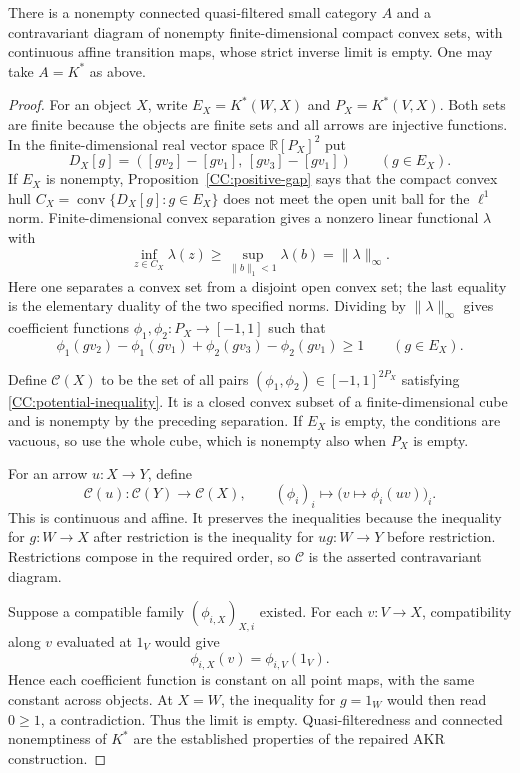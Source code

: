 \begin{theorem}
\label{CC:convex-counterexample}
There is a nonempty connected quasi-filtered small category $A$ and
a contravariant diagram of nonempty finite-dimensional compact convex
sets, with continuous affine transition maps, whose strict inverse
limit is empty. One may take $A=K^*$ as above.
\end{theorem}
\begin{proof}
For an object $X$, write $E_X=K^*(W,X)$ and $P_X=K^*(V,X)$.
Both sets are finite because the objects are finite sets and all
arrows are injective functions. In the finite-dimensional real vector
space $\mathbb R[P_X]^2$ put
\[
 D_X[g]=([gv_2]-[gv_1],\,[gv_3]-[gv_1])
 \qquad(g\in E_X).
\]
If $E_X$ is nonempty, Proposition~\ref{CC:positive-gap} says that the
compact convex hull $C_X=\operatorname{conv}\{D_X[g]:g\in E_X\}$
does not meet the open unit ball for the $\ell^1$ norm.
Finite-dimensional convex separation gives a nonzero linear functional
$\lambda$ with
\[
 \inf_{z\in C_X}\lambda(z)
 \geq\sup_{\|b\|_1<1}\lambda(b)=\|\lambda\|_\infty.
\]
Here one separates a convex set from a disjoint open convex set; the
last equality is the elementary duality of the two specified norms.
Dividing by $\|\lambda\|_\infty$ gives coefficient functions
$\phi_1,\phi_2:P_X\to[-1,1]$ such that
\begin{equation}\label{CC:potential-inequality}
 \phi_1(gv_2)-\phi_1(gv_1)
 +\phi_2(gv_3)-\phi_2(gv_1)\geq1
 \qquad(g\in E_X).
\end{equation}

Define $\mathcal C(X)$ to be the set of all pairs
$(\phi_1,\phi_2)\in[-1,1]^{2P_X}$ satisfying
\eqref{CC:potential-inequality}. It is a closed convex subset of a
finite-dimensional cube and is nonempty by the preceding separation.
If $E_X$ is empty, the conditions are vacuous, so use the whole cube,
which is nonempty also when $P_X$ is empty.

For an arrow $u:X\to Y$, define
\[
 \mathcal C(u):\mathcal C(Y)\longrightarrow\mathcal C(X),
 \qquad(\phi_i)_i\longmapsto
 \bigl(v\longmapsto\phi_i(uv)\bigr)_i.
\]
This is continuous and affine. It preserves the inequalities because
the inequality for $g:W\to X$ after restriction is the inequality
for $ug:W\to Y$ before restriction. Restrictions compose in the
required order, so $\mathcal C$ is the asserted contravariant diagram.

Suppose a compatible family $(\phi_{i,X})_{X,i}$ existed. For each
$v:V\to X$, compatibility along $v$ evaluated at $1_V$ would give
\[
 \phi_{i,X}(v)=\phi_{i,V}(1_V).
\]
Hence each coefficient function is constant on all point maps, with
the same constant across objects. At $X=W$, the inequality for
$g=1_W$ would then read $0\geq1$, a contradiction. Thus the limit
is empty. Quasi-filteredness and connected nonemptiness of $K^*$ are
the established properties of the repaired AKR construction.
\end{proof}


